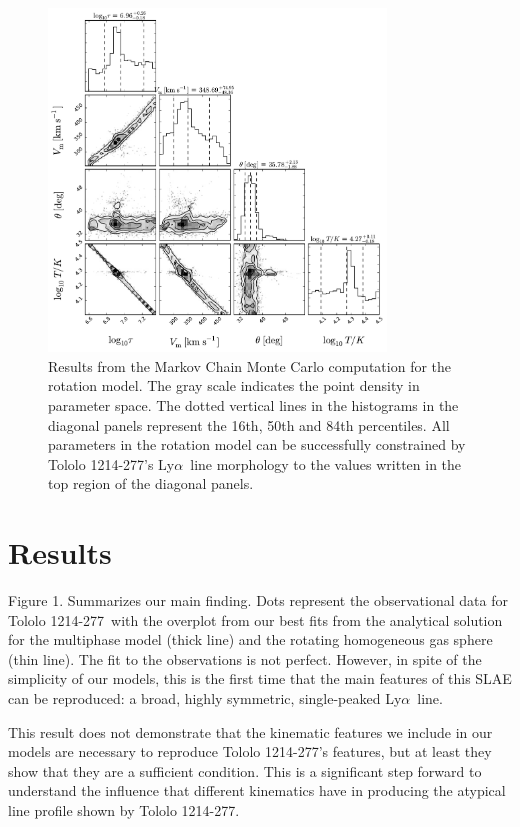 \documentclass[a4paper,fleqn,usenatbib]{mnras}
\newcommand{\tol}{Tololo 1214-277}
\newcommand{\lya}{\ifmmode{{\rm Ly}\alpha}\else Ly$\alpha$\ \fi}
\begin{document}
\begin{figure}
\begin{center}
\includegraphics[width=0.8\textwidth]{emcee_results.pdf}
\caption{Results from the Markov Chain Monte Carlo computation for
    the rotation model. 
    The gray scale indicates the point density in parameter space. 
    The dotted vertical lines in the histograms in the diagonal panels
    represent the 16th, 50th and 84th percentiles. 
    All parameters in the rotation model can be successfully constrained by \tol's
    \lya line morphology to the values written in the top region of
    the diagonal panels.
    \label{emceeresults}} 
\end{center}
\end{figure}


\section{Results}


Figure 1. Summarizes our main finding.
Dots represent the observational data for \tol\ with the
overplot from our best fits from the analytical solution for the
multiphase model (thick line)  and the rotating homogeneous gas sphere
(thin line). 
The fit to the observations is not perfect. 
However, in spite of the
simplicity of our models, this is the first time that the main
features of this SLAE can be reproduced: a broad, highly symmetric,
single-peaked \lya line. 

This result does not demonstrate that the kinematic features we
include in our models are necessary to reproduce \tol's features, but
at least they show that they are a sufficient condition.
This is a significant step forward to understand the influence that
different kinematics have in producing the atypical line profile shown
by \tol.
\end{document}
